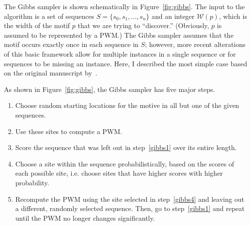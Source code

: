 The Gibbs sampler is shown schematically in Figure~\vref{fig:gibbs}.
The input to the algorithm is a set of sequences $S = \{
s_0,s_1,\ldots,s_n\}$ and an integer $\mathscr{W}(p)$, which is the
width of the motif $p$ that we are trying to ``discover.''
(Obviously, $p$ is assumed to be represented by a PWM.)  The Gibbs
sampler assumes that the motif occurs exactly once in each
sequence in $S$; however, more recent alterations of this basic
framework allow for multiple instances in a single sequence or for
sequences to be missing an instance.  Here, I described the most
simple case based on the original manuscript
by~\citeauthor{lawrence1993detecting}.

As shown in  Figure~\ref{fig:gibbs}, the Gibbs sampler has five
major steps.
\begin{enumerate}
  \item Choose random starting locations for the motive in all but
  one of the given sequences.\label{gibbs1}
  \item Use these sites to compute a PWM.
  \item Score the sequence that was left out in step~\ref{gibbs1}
  over its entire length.\label{gibbs3}
  \item Choose a site within the sequence probabilistically, based
  on the scores of each possible site, i.e. choose sites that have
  higher scores with higher probability.\label{gibbs4}
  \item Recompute the PWM using the site selected in step~\ref{gibbs4}
  and leaving out a different, randomly selected sequence.  Then, go
  to step~\ref{gibbs1} and repeat until the PWM no longer changes
  significantly.
\end{enumerate}

